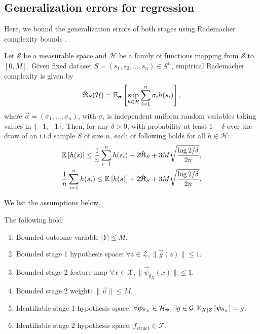 \subsection{Generalization errors for regression}
Here, we bound the generalization errors of both stages using Rademacher complexity bounds \citep{FoundationOfML}.

\begin{prop}{\citep[Theorem 3.3][with slight modification]{FoundationOfML}} \label{prop:bound}
    Let $\mathcal{S}$ be a measurable space and $\mathcal{H}$ be a family of functions mapping from $\mathcal{S}$ to $[0, M]$. Given fixed dataset $S = (s_1, s_2, \dots, s_n) \in \mathcal{S}^n$, empirical Rademacher complexity is given by
    \begin{align*}
        \hat{\mathfrak{R}}_S(\mathcal{H}) = \expect[\vec{\sigma}]{\sup_{h\in \mathcal{H}} \sum_{i=1}^n \sigma_i h(s_i)},
    \end{align*}
    where $\vec{\sigma}=(\sigma_1,\dots,\sigma_n)$, 
    with $\sigma_i$ is independent uniform random variables taking values in $\{-1,+1\}$. Then, for any $\delta > 0$, with probability at least $1-\delta$ over the draw of an i.i.d sample $S$ of size $n$,  each of following holds for all $h \in \mathcal{H}$:
    \begin{align*}
        &\expect{h(s)} \leq \frac1n \sum_{i=1}^n h(s_i) + 2 \hat{\mathfrak{R}}_S + 3M \sqrt{\frac{\log 2/\delta}{2n}},\\
        & \frac1n \sum_{i=1}^n h(s_i) \leq \expect{h(s)} + 2 \hat{\mathfrak{R}}_S + 3M \sqrt{\frac{\log 2/\delta}{2n}}.
    \end{align*}
\end{prop}

We list the assumptions below.
\begin{assum} \label{assume-consist}
   The following hold:
    \begin{enumerate}
    \item Bounded outcome variable $|Y| \leq M$.
    \item  Bounded stage 1 hypothesis space: $ \forall z \in \mathcal{Z}, \|\vec{g}(z)\| \leq 1$.
    \item Bounded stage 2 feature map $\forall x \in \mathcal{X}, \|\vec{\psi}_{\theta_X}(x) \| \leq 1 $.
    \item  Bounded stage 2 weight: $\|\vec{u}\| \leq M$.
    \item Identifiable stage 1 hypothesis space: $ \forall \vec{\psi}_{\theta_X} \in \mathcal{H}_{\vec{\psi}}, \exists g\in \mathcal{G}, \expect[X|Z]{\vec{\psi}_{\theta_X}} = g$.
    \item Identifiable stage 2 hypothesis space: $f_{\mathrm{struct}} \in \mathcal{F}$. 
    \end{enumerate}
\end{assum}

